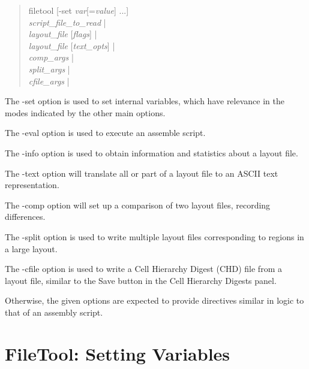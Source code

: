 \begin{quote}
{\vt filetool} [{\vt -set} {\it var\/}[={\it value\/}] {\vt ...}]\\
    \hspace*{1em}{\vt -eval} {\it script\_file\_to\_read} {\vt |}\\
    \hspace*{1em}{\vt -info} {\it layout\_file} [{\it flags\/}] {\vt |}\\
    \hspace*{1em}{\vt -text} {\it layout\_file} [{\it text\_opts\/}] {\vt |}\\
    \hspace*{1em}{\vt -comp} {\it comp\_args\/} {\vt |}\\
    \hspace*{1em}{\vt -split} {\it split\_args} {\vt |}\\
    \hspace*{1em}{\vt -cfile} {\it cfile\_args} {\vt |}\\
    \hspace*{1em}{\it translate\_args}
\end{quote}

The {\vt -set} option is used to set internal variables, which have
relevance in the modes indicated by the other main options.

The {\vt -eval} option is used to execute an assemble script.

The {\vt -info} option is used to obtain information and statistics
about a layout file.

The {\vt -text} option will translate all or part of a layout file to
an ASCII text representation.

The {\vt -comp} option will set up a comparison of two layout files,
recording differences.

The {\vt -split} option is used to write multiple layout files
corresponding to regions in a large layout.

The {\vt -cfile} option is used to write a Cell Hierarchy Digest (CHD)
file from a layout file, similar to the {\cb Save} button in the {\cb
Cell Hierarchy Digests} panel.

Otherwise, the given options are expected to provide directives
similar in logic to that of an assembly script.

\section{FileTool:  Setting Variables}

